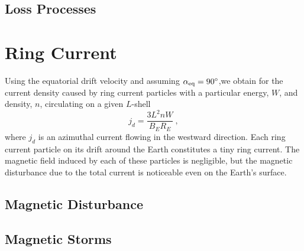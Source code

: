 \documentclass[12pt,a4paper]{article}
\begin{document}
\subsection{Loss Processes}

















\section{Ring Current}
Using the equatorial drift velocity and assuming $\alpha_{\rm eq} = 90^\circ$,we obtain for the current density caused by ring current particles with a particular energy, $W$, and density, $n$, circulating on a given $L$-shell
\begin{equation}
j_d = \dfrac{3L^2 n W}{B_E R_E} ~,
\end{equation}
where $j_d$ is an azimuthal current flowing in the westward direction. Each ring current particle on its drift around the Earth constitutes a tiny ring current. The magnetic field induced by each of these particles is negligible, but the magnetic disturbance due to the total current is noticeable even on the Earth's surface.

\subsection{Magnetic Disturbance}



\subsection{Magnetic Storms}






\end{document}
